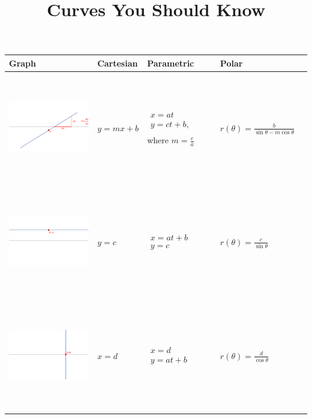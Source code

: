 \documentclass[12pt]{article}
\title{\vspace{-0.75in}\Huge{Curves You Should Know}\vspace{-0.5in}}
\date{}
\begin{document}
	\maketitle
	\begin{center}
	\begin{tabular}{|C{2.75in}|C{1.625in}|C{1.625in}|C{1.625in}|N}
	\hline
	\textbf{Graph} & 
	\textbf{Cartesian} & 
	\textbf{Parametric} & 
	\textbf{Polar}& \\[5mm]
	
	\hline
	\includegraphics[trim={0 -4.5mm 0 -4.5mm}, clip, height=1.875in]{1_Lines} & 
	$y=mx+b$ & 
	$\begin{array}{c}
	x=at\\
	y=ct+b,\\[6mm]
	\end{array}$ \newline where $ m=\frac{c}{a}$ \vspace{-14mm} & 
	$r(\theta)=\frac{b}{\sin{\theta}-m\cos{\theta}}$ & \\
	
	\hline
	\includegraphics[trim={0 -4.5mm 0 -4.5mm}, clip, height=1.875in]{1_Lines2} & 
	$y=c$ & 
	$\begin{array}{c}
	x=at+b\\
	y=c
	\end{array}$ & 
	$r(\theta)=\frac{c}{\sin{\theta}}$ & \\
	
	\hline
	\includegraphics[trim={0 -4.5mm 0 -4.5mm}, clip, height=1.875in]{1_Lines3} &
	$x = d$ &
	$\begin{array}{c}
	x=d\\
	y=at+b
	\end{array}$ &
	$r(\theta) = \frac{d}{\cos{\theta}}$ & \\
	

\end{tabular}
\end{center}
\end{document}
